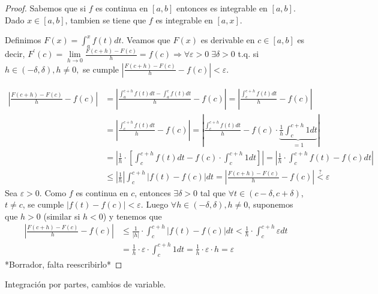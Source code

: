 \begin{proof}
	Sabemos que si \(f \) es continua en \([a,b ]\) entonces es integrable en \([a,b ]\). Dado \(x \in [a,b ]\), tambien se tiene que \(f \) es integrable en \([a,x ]\).

	Definimos \(F(x) = \int^{x}_a f(t) dt  \). Veamos que \(F(x )\) es derivable en \(c \in [a,b ]\) es decir, \(F^\prime (c) = \lim\limits_{h  \to 0 } \frac{F(c + h) - F(c )}{h} = f(c) \Rightarrow \forall \varepsilon > 0 \;\exists \delta > 0\) t.q. si \(h \in (-\delta, \delta), h \neq 0,\) se cumple \(\left\vert \frac{F(c+h) - F(c)}{h} - f(c) \right\vert < \varepsilon \).

	\begin{align*}
		\left\vert \frac{F(c+h) - F(c)}{h} - f(c) \right\vert & = \left\vert \frac{\int^{c+h}_a f(t )dt  - \int^{c}_a f(t) dt }{h} - f(c) \right\vert = \left\vert \frac{\int^{c+h}_c f(t) dt }{h} - f(c) \right\vert                                        \\
		                                                      & = \left\vert \frac{\int^{c +h}_c f(t) dt }{h} - f(c ) \right\vert = \left\vert \frac{\int^{c + h}_c f(t)dt }{h} - f(c) \cdot \underbrace{\frac{1}{h} \int^{c +h}_{c} 1 dt }_{=1} \right\vert \\ & = \left\vert \frac{1}{h} \cdot \left [ \int^{c + h}_c f(t) dt - f(c) \cdot \int^{c + h}_{c} 1 dt   \right ] \right\vert = \left\vert \frac{1}{h} \cdot \int^{c +h}_c f(t) - f(c) dt   \right\vert \\ & \leq \left\vert \frac{1}{h } \right\vert \int^{c + h}_{c} \left\vert f(t) - f(c ) \right\vert dt = \left\vert \frac{F(c + h ) - F(c)}{h} - f(c) \right\vert  \overset{?}{<} \varepsilon
	\end{align*}
	Sea \(\varepsilon > 0 \). Como \(f \) es continua en \(c \), entonces \(\exists \delta > 0 \) tal que \(\forall t \in (c - \delta, c + \delta)\), \(t \neq c\), se cumple \(\left\vert f(t) - f(c ) \right\vert < \varepsilon\). Luego \(\forall h \in (- \delta, \delta ), h \neq 0\), suponemos que \(h > 0 \) (similar si \(h < 0 \)) y tenemos que
	\begin{align*}
		\left\vert \frac{F(c + h) - F(c )}{h} - f(c) \right\vert & \leq \frac{1}{\left\vert h  \right\vert } \cdot \int^{c + h}_c \left\vert f(t) - f(c ) \right\vert dt < \frac{1}{h} \cdot \int^{c + h}_c \varepsilon dt \\ & =  \frac{1}{h} \cdot \varepsilon \cdot \int^{c + h}_c 1 dt = \frac{1}{h} \cdot \varepsilon \cdot h = \varepsilon
	\end{align*}
	*Borrador, falta reescribirlo*
\end{proof}

Integración por partes, cambios de variable.